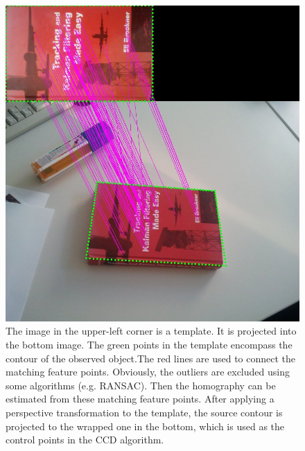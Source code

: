 \begin{figure}[htbp]
  \centering
\includegraphics[width=\linewidth]{images/sift.jpg}
\caption[Contour initialization using the SIFT algorithm]{The image in
  the upper-left corner is a template. It is projected into the bottom
  image. The green points in the template encompass the
  contour of the observed object.The red lines are used to connect the matching feature
  points. Obviously, the outliers are excluded using some algorithms
  (e.g. RANSAC). Then the homography can be estimated from these matching
  feature points.  After applying a perspective
  transformation to the template, the source contour is projected to
  the wrapped one in the bottom, which is used as the control points
  in the CCD algorithm.
  }
\label{fig:sift}
\end{figure}

